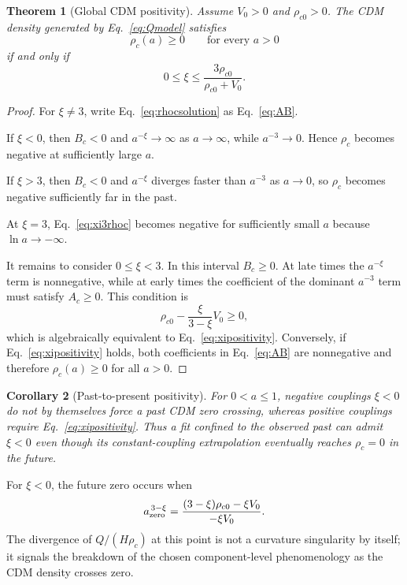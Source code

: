 \documentclass[11pt]{article}
\newtheorem{theorem}{Theorem}[section]
\newtheorem{corollary}[theorem]{Corollary}
\theoremstyle{remark}
\begin{document}
\begin{theorem}[Global CDM positivity]
\label{thm:positivity}
Assume $V_0>0$ and $\rho_{c0}>0$.  The CDM density generated by Eq.~\eqref{eq:Qmodel} satisfies
\begin{equation}
    \rho_c(a)\ge0
    \qquad\text{for every }a>0
    \label{eq:globalpositive}
\end{equation}
if and only if
\begin{equation}
    \boxed{
    0\le\xi\le
    \frac{3\rho_{c0}}{\rho_{c0}+V_0}
    }.
    \label{eq:xipositivity}
\end{equation}
\end{theorem}

\begin{proof}
For $\xi\neq3$, write Eq.~\eqref{eq:rhocsolution} as Eq.~\eqref{eq:AB}.

If $\xi<0$, then $B_c<0$ and $a^{-\xi}\to\infty$ as $a\to\infty$, while $a^{-3}\to0$.  Hence $\rho_c$ becomes negative at sufficiently large $a$.

If $\xi>3$, then $B_c<0$ and $a^{-\xi}$ diverges faster than $a^{-3}$ as $a\to0$, so $\rho_c$ becomes negative sufficiently far in the past.

At $\xi=3$, Eq.~\eqref{eq:xi3rhoc} becomes negative for sufficiently small $a$ because $\ln a\to-\infty$.

It remains to consider $0\le\xi<3$.  In this interval $B_c\ge0$.  At late times the $a^{-\xi}$ term is nonnegative, while at early times the coefficient of the dominant $a^{-3}$ term must satisfy $A_c\ge0$.  This condition is
\begin{equation}
    \rho_{c0}-\frac{\xi}{3-\xi}V_0\ge0,
\end{equation}
which is algebraically equivalent to Eq.~\eqref{eq:xipositivity}.  Conversely, if Eq.~\eqref{eq:xipositivity} holds, both coefficients in Eq.~\eqref{eq:AB} are nonnegative and therefore $\rho_c(a)\ge0$ for all $a>0$.
\end{proof}

\begin{corollary}[Past-to-present positivity]
For $0<a\le1$, negative couplings $\xi<0$ do not by themselves force a past CDM zero crossing, whereas positive couplings require Eq.~\eqref{eq:xipositivity}.  Thus a fit confined to the observed past can admit $\xi<0$ even though its constant-coupling extrapolation eventually reaches $\rho_c=0$ in the future.
\end{corollary}

For $\xi<0$, the future zero occurs when
\begin{equation}
    a_{\rm zero}^{\,3-\xi}
    =\frac{(3-\xi)\rho_{c0}-\xi V_0}{-\xi V_0}.
    \label{eq:futurezero}
\end{equation}
The divergence of $Q/(H\rho_c)$ at this point is not a curvature singularity by itself; it signals the breakdown of the chosen component-level phenomenology as the CDM density crosses zero.
\end{document}
